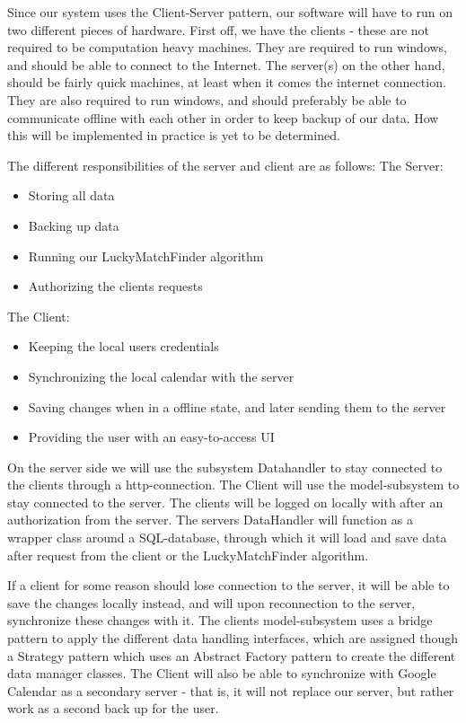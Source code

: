 Since our system uses the Client-Server pattern, our software will have to run on two different pieces of hardware. First off, we have the clients - these are not required to be computation heavy machines. They are required to run windows, and should be able to connect to the Internet. 
The server(s) on the other hand, should be fairly quick machines, at least when it comes the internet connection. They are also required to run windows, and should preferably be able to communicate offline with each other in order to keep backup of our data. How this will be implemented in practice is yet to be determined. 

The different responsibilities of the server and client are as follows:
The Server:
\begin{itemize}
	\item Storing all data
	\item Backing up data
	\item Running our LuckyMatchFinder algorithm
	\item Authorizing the clients requests
\end{itemize}
The Client:
\begin{itemize}
	\item Keeping the local users credentials
	\item Synchronizing the local calendar with the server
	\item Saving changes when in a offline state, and later sending them to the server
	\item Providing the user with an easy-to-access UI
\end{itemize}

On the server side we will use the subsystem Datahandler to stay connected to the clients through a http-connection. The Client will use the model-subsystem to stay connected to the server. The clients will be logged on locally with after an authorization from the server.
The servers DataHandler will function as a wrapper class around a SQL-database, through which it will load and save data after request from the client or the LuckyMatchFinder algorithm. 

If a client for some reason should lose connection to the server, it will be able to save the changes locally instead, and will upon reconnection to the server, synchronize these changes with it. The clients model-subsystem uses a bridge pattern to apply the different data handling interfaces, which are assigned though a Strategy pattern which uses an Abstract Factory pattern to create the different data manager classes. 
The Client will also be able to synchronize with Google Calendar as a secondary server - that is, it will not replace our server, but rather work as a second back up for the user. 